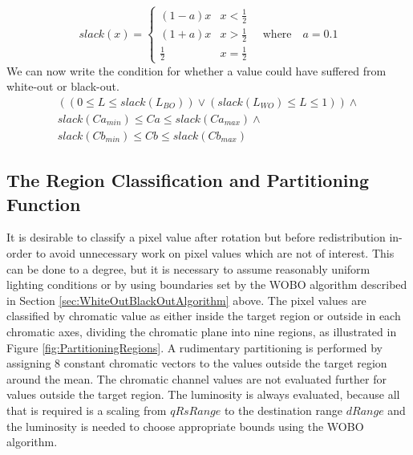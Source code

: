  \begin{equation}
 slack(x) = \begin{cases}
 (1-a) x     & x < \frac{1}{2} \\
 (1+a) x     & x > \frac{1}{2} \\
 \frac{1}{2} & x = \frac{1}{2} 
 \end{cases} \quad \text{where} \quad a = 0.1
   \end{equation}
 We can now write the condition for whether a value could have suffered from white-out or black-out. 
  \begin{multline}\label{eq:InWoBoRegion}
 (( 0 \le L \le  slack(L_{BO}) ) \vee ( slack(L_{WO}) \le L \le 1) ) \wedge  \\
 slack(Ca_{min}) \le Ca \le  slack(Ca_{max}) \wedge  \\
 slack(Cb_{min}) \le Cb \le  slack(Cb_{max})
  \end{multline}
  
  \subsection{The Region Classification and Partitioning Function}\label{sec:TheRegionClassificationAndPartitioningFunction}
  It is desirable to classify a pixel value after rotation but before redistribution in-order to avoid unnecessary work on pixel values which are not of interest. This can be done to a degree, but it is necessary to assume reasonably uniform lighting conditions or by using boundaries set by the WOBO algorithm described in Section \ref{sec:WhiteOutBlackOutAlgorithm} above. The pixel values are classified by chromatic value as either inside the target region or outside in each chromatic axes, dividing the chromatic plane into nine regions, as illustrated in Figure \ref{fig:PartitioningRegions}. A rudimentary partitioning is performed by assigning 8 constant chromatic vectors to the values outside the target region around the mean. The chromatic channel values are not evaluated further for values outside the target region. The luminosity is always evaluated, because all that is required is a scaling from $qRsRange$ to the destination range $dRange$  and the luminosity is needed to choose appropriate bounds using the WOBO algorithm.
  

